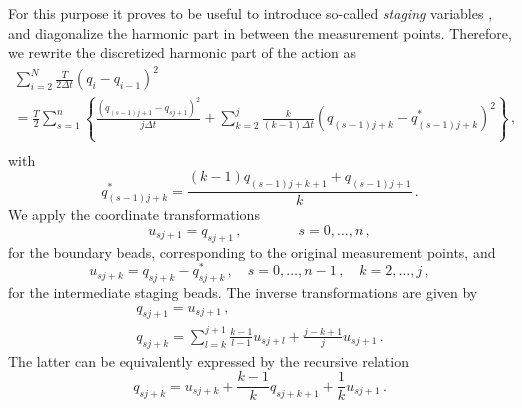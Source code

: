\documentclass[12pt,a4paper,final]{iopart}
\begin{document}
For this purpose it proves to be useful to introduce so-called \emph{staging} variables \cite{tuckerman_1992}, and diagonalize the harmonic part in between the measurement points.
Therefore, we rewrite the discretized harmonic part of the action as
\begin{eqnarray}
  \sum_{i=2}^{N}
  \frac{T}{2\Delta t}
  (q_i-q_{i-1})^2 \nonumber
  \\ =
  \frac{T}{2}
  \sum_{s=1}^{n}\left\{
    \frac{(q_{(s-1)j+1} - q_{sj+1})^2}{j\Delta t}
    +
    \sum_{k=2}^j
    \frac{k}{(k-1)\Delta t}
    (q_{(s-1)j+k}-q^*_{(s-1)j+k})^2
  \right\}\,,\nonumber
  \\
\end{eqnarray}
with
\begin{equation}
  q^*_{(s-1)j+k}
  =
  \frac{(k-1)q_{(s-1)j+k+1} + q_{(s-1)j+1} }{k}
  \,.
\end{equation}
We apply the coordinate transformations
\begin{equation}
  u_{sj+1} = q_{sj+1}\,, \qquad\qquad s=0,\dots,n\, ,
\end{equation}
for the boundary beads, corresponding to the original measurement points, and
\begin{equation}
  u_{sj+k} = q_{sj+k} - q^*_{sj+k}\,, \quad s=0,\dots,n-1\, , \quad k=2,\dots,j\, ,
\end{equation}
for the intermediate staging beads.
The inverse transformations are given by
\begin{eqnarray}
  q_{sj+1} = u_{sj+1}\,,
  \\
  q_{sj+k} = \sum_{l=k}^{j+1}\frac{k-1}{l-1}u_{sj+l}
  +\frac{j-k+1}{j}u_{sj+1}\,.
\end{eqnarray}
The latter can be equivalently expressed by the recursive relation
\begin{equation}
  q_{sj+k} = u_{sj+k} + \frac{k-1}{k} q_{sj+k+1}+ \frac{1}{k}u_{sj+1} \,.
\end{equation}
\end{document}
